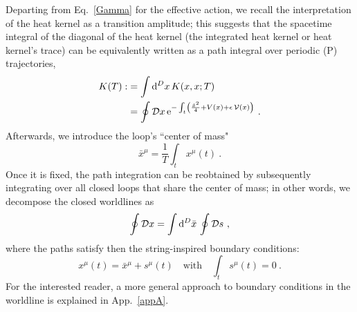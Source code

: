 \documentclass[12pt,a4paper]{article}
\numberwithin{equation}{section}
\numberwithin{equation}{section}
\begin{document}
Departing from Eq.~\eqref{Gamma} for the effective action, we recall the interpretation of the heat kernel as a transition amplitude; this suggests that the spacetime integral of the diagonal of the heat kernel (the integrated heat kernel or heat kernel's trace) can be equivalently written as a path integral over periodic (P) trajectories,
\begin{align} \label{path3}
\begin{split}
{K}(T):&= \int {\rm d}^Dx \, K(x,x;T) 
\\
&=\oint \mathcal{D}x \, \mathrm{e}^{-\int_t \left( \frac{\dot{x}^2}{4}+ V(x) +\epsilon \, \mathcal{V}(x) \right)}\ . 
\end{split}
\end{align}
Afterwards, we introduce the loop's ``center of mass"
\begin{equation} \label{CdM}
\bar{x}^\mu=\frac{1}{T} \int_t \, x^\mu(t)\ .
\end{equation}
Once it is fixed, the path integration can be reobtained by subsequently integrating over all closed loops that share the center of mass; in other words, we decompose the closed worldlines as
\begin{equation}
\oint \mathcal{D}x=\int {\rm d}^D \bar{x} \, \oint \mathcal{D}s\ ,
\end{equation}
where the paths satisfy then the string-inspired boundary conditions:
\begin{equation} \label{s}
x^\mu(t)=\bar{x}^\mu+s^\mu(t) \quad \text{with} \quad \int_t \, s^\mu(t)=0\ .
\end{equation}
For the interested reader, a more general approach to boundary conditions in the worldline is explained in App.~\ref{appA}.
\end{document}
